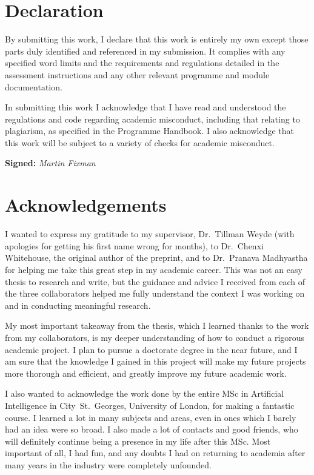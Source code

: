 \documentclass[a4paper,11pt]{article}
\begin{document}
\section*{Declaration}

By submitting this work, I declare that this work is entirely my own except those parts duly identified and referenced in my submission.
It complies with any specified word limits and the requirements and regulations detailed in the assessment instructions and any other relevant programme and module documentation.

In submitting this work I acknowledge that I have read and understood the regulations and code regarding academic misconduct, including that relating to plagiarism, as specified in the Programme Handbook.
I also acknowledge that this work will be subject to a variety of checks for academic misconduct.

\textbf{Signed:} \textsl{Martin Fixman}

\section*{Acknowledgements}

I wanted to express my gratitude to my supervisor, Dr.\ Tillman Weyde (with apologies for getting his first name wrong for months), to Dr.\ Chenxi Whitehouse, the original author of the preprint, and to Dr.\ Pranava Madhyastha for helping me take this great step in my academic career.
This was not an easy thesis to research and write, but the guidance and advice I received from each of the three collaborators helped me fully understand the context I was working on and in conducting meaningful research.

My most important takeaway from the thesis, which I learned thanks to the work from my collaborators, is my deeper understanding of how to conduct a rigorous academic project.
I plan to pursue a doctorate degree in the near future, and I am sure that the knowledge I gained in this project will make my future projects more thorough and efficient, and greatly improve my future academic work.

I also wanted to acknowledge the work done by the entire MSc in Artificial Intelligence in City~St.~Georges, University of London, for making a fantastic course.
I learned a lot in many subjects and areas, even in ones which I barely had an idea were so broad.
I also made a lot of contacts and good friends, who will definitely continue being a presence in my life after this MSc.
Most important of all, I had fun, and any doubts I had on returning to academia after many years in the industry were completely unfounded.
\end{document}
